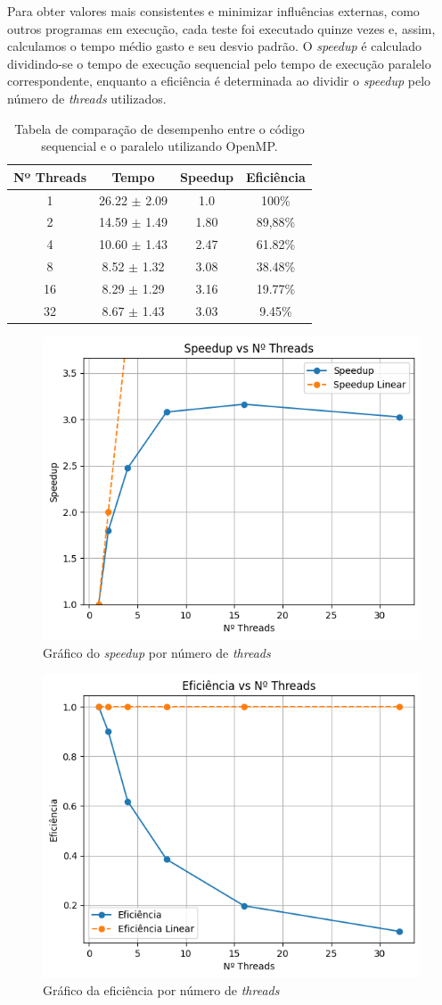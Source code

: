 \documentclass[12pt]{article}
\begin{document}
Para obter valores mais consistentes e minimizar influências externas, como
outros programas em execução, cada teste foi executado quinze vezes e, assim,
calculamos o tempo médio gasto e seu desvio padrão. O \textit{speedup} é
calculado dividindo-se o tempo de execução sequencial pelo tempo de execução
paralelo correspondente, enquanto a eficiência é determinada ao dividir o
\textit{speedup} pelo número de \textit{threads} utilizados.

\begin{table}[ht]
  \centering
  \caption{Tabela de comparação de desempenho entre o código sequencial e o
    paralelo utilizando OpenMP.}
  \vspace{0.3cm}
  \begin{tabular}{||c c c c||}
    \hline
    Nº Threads & Tempo            & Speedup & Eficiência \\ [0.5ex]
    \hline\hline
    1          & 26.22 $\pm$ 2.09 & 1.0     & 100\%      \\
    \hline
    2          & 14.59 $\pm$ 1.49 & 1.80    & 89,88\%    \\
    \hline
    4          & 10.60 $\pm$ 1.43 & 2.47    & 61.82\%    \\
    \hline
    8          & 8.52 $\pm$ 1.32  & 3.08    & 38.48\%    \\
    \hline
    16         & 8.29 $\pm$ 1.29  & 3.16    & 19.77\%    \\
    \hline
    32         & 8.67 $\pm$ 1.43  & 3.03    & 9.45\%     \\
    \hline
  \end{tabular}
\end{table}

\begin{figure}[ht]
  \centering
  \includegraphics[width=.45\textwidth]{figs/speedupxthreads.png}
  \caption{Gráfico do \textit{speedup} por número de \textit{threads}}
  \label{fig:speedupOMP}
\end{figure}

\begin{figure}[ht]
  \centering
  \includegraphics[width=.45\textwidth]{figs/eficienciaxthreads.png}
  \caption{Gráfico da eficiência por número de \textit{threads}}
  \label{fig:eficienciaOMP}
\end{figure}
\end{document}
